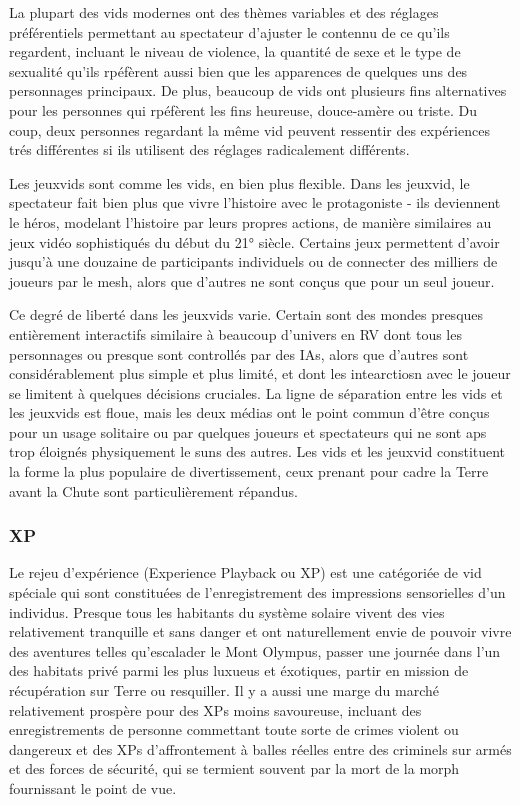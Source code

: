 La plupart des vids modernes ont des thèmes variables et des réglages préférentiels permettant au spectateur d'ajuster le contennu de ce qu'ils regardent, incluant le niveau de violence, la quantité de sexe et le type de sexualité qu'ils rpéfèrent aussi bien que les apparences de quelques uns des personnages principaux. De plus, beaucoup de vids ont plusieurs fins alternatives pour les personnes qui rpéfèrent les fins heureuse, douce-amère ou triste. Du coup, deux personnes regardant la même vid peuvent ressentir des expériences trés différentes si ils utilisent des réglages radicalement différents. 

Les jeuxvids sont comme les vids, en bien plus flexible. Dans les jeuxvid, le spectateur fait bien plus que vivre l'histoire avec le protagoniste  - ils deviennent le héros, modelant l'histoire par leurs propres actions, de manière similaires au jeux vidéo sophistiqués du début du 21° siècle. Certains jeux permettent d'avoir jusqu'à une douzaine de participants individuels ou de connecter des milliers de joueurs par le mesh, alors que d'autres ne sont conçus que pour un seul joueur. 

Ce degré de liberté dans les jeuxvids varie. Certain sont des mondes presques entièrement interactifs similaire à beaucoup d'univers en RV dont tous les personnages ou presque sont controllés par des IAs, alors que d'autres sont considérablement plus simple et plus limité, et dont les intearctiosn avec le joueur se limitent à quelques décisions cruciales. La ligne de séparation entre les vids et les jeuxvids est floue, mais les deux médias ont le point commun d'être conçus pour un usage solitaire ou par quelques joueurs et spectateurs qui ne sont aps trop éloignés physiquement le suns des autres. Les vids et les jeuxvid constituent la forme la plus populaire de divertissement, ceux prenant pour cadre la Terre avant la Chute sont particulièrement répandus. 

\subsubsection{XP} \label{sec:xp} 

Le rejeu d'expérience (Experience Playback ou XP) est une catégoriée de vid spéciale qui sont constituées de l'enregistrement des impressions sensorielles d'un individus. Presque tous les habitants du système solaire vivent des vies relativement tranquille et sans danger et ont naturellement envie de pouvoir vivre des aventures telles qu'escalader le Mont Olympus, passer une journée dans l'un des habitats privé parmi les plus luxueus et éxotiques, partir en mission de récupération sur Terre ou resquiller. Il y a aussi une marge du marché relativement prospère pour des XPs moins savoureuse, incluant des enregistrements de personne commettant toute sorte de crimes violent ou dangereux et des XPs d'affrontement à balles réelles entre des criminels sur armés et des forces de sécurité, qui se termient souvent par la mort de la morph fournissant le point de vue. 

